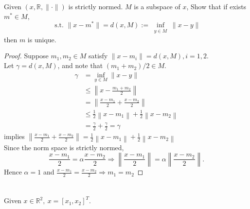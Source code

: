 \documentclass{article}
\theoremstyle{definition} %
\newcommand{\RR}{\mathbb{R}}
\begin{document}
\section{}
Given $(x, \mathbb{R},\|\cdot\|)$ is strictly normed. $M$ is a subspace of $x$, Show that if exists $m^* \in M$,
$$
\text { s.t. }\|x-m^*\|=d(x, M):=\inf _{\substack{y \in M}}\|x-y\|
$$
then $m$ is unique.

\begin{proof}
    Suppose $m_1, m_2 \in M$ satisfy $\|x-m_i\| = d(x, M), i=1,2$.\\
    Let $\gamma = d(x, M)$, and note that $(m_1+m_2)/2 \in M$.
    \begin{align*}
        \gamma &=\inf _{y \in M}\|x-y\| \\
        &\leq\left\|x-\frac{m_1+m_2}{2}\right\| \\
        &=\left\|\frac{x-m_1}{2}+\frac{x-m_2}{2}\right\| \\
        &\leq \frac{1}{2}\left\|x-m_1\right\|+\frac{1}{2}\left\|x-m_2\right\| \\
        &=\frac{\gamma}{2}+\frac{\gamma}{2}=\gamma   
    \end{align*}
    implies $\left\|\frac{x-m_1}{2}+\frac{x-m_2}{2}\right\| = \frac{1}{2}\left\|x-m_1\right\|+\frac{1}{2}\left\|x-m_2\right\|$\\
    Since the norm space is strictly normed, 
    $$
    \frac{x-m_1}{2}=\alpha \frac{x-m_2}{2} \Rightarrow\left\|\frac{x-m_1}{2}\right\|=\alpha \left\|\frac{x-m_2}{2}\right\|.
    $$
    Hence $\alpha=1$ and $\frac{x-m_1}{2}=\frac{x-m_2}{2} \Rightarrow m_1=m_2$
\end{proof}

\section{}
Given $ x\in \RR^2, \ x = [x_1, x_2]^T$.
\end{document}
